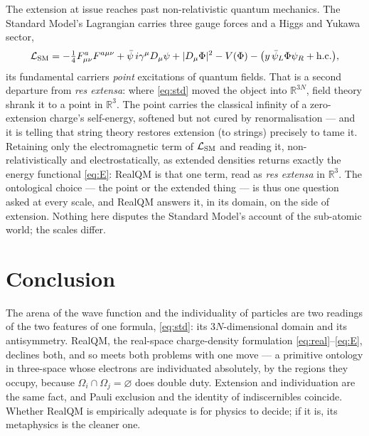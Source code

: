 \documentclass[11pt]{article}
\begin{document}
The extension at issue reaches past non-relativistic quantum mechanics. The Standard Model's Lagrangian
carries three gauge forces and a Higgs and Yukawa sector,
\begin{equation}
\mathcal L_{\rm SM}=-\tfrac14 F^a_{\mu\nu}F^{a\mu\nu}
+\bar\psi\,i\gamma^\mu D_\mu\psi+|D_\mu\Phi|^2-V(\Phi)-\big(y\,\bar\psi_L\Phi\psi_R+\text{h.c.}\big),
\end{equation}
its fundamental carriers \emph{point} excitations of quantum fields. That is a second departure from
\emph{res extensa}: where \eqref{eq:std} moved the object into $\mathbb R^{3N}$, field theory shrank it to
a point in $\mathbb R^3$. The point carries the classical infinity of a zero-extension charge's
self-energy, softened but not cured by renormalisation --- and it is telling that string theory restores
extension (to strings) precisely to tame it. Retaining only the electromagnetic term of $\mathcal L_{\rm
SM}$ and reading it, non-relativistically and electrostatically, as extended densities returns exactly the
energy functional \eqref{eq:E}: RealQM is that one term, read as \emph{res extensa} in $\mathbb R^3$. The
ontological choice --- the point or the extended thing --- is thus one question asked at every scale, and
RealQM answers it, in its domain, on the side of extension. Nothing here
disputes the Standard Model's account of the sub-atomic world; the scales differ.

\section{Conclusion}
\label{sec:concl}

The arena of the wave function and the individuality of particles are two readings of the two features of
one formula, \eqref{eq:std}: its $3N$-dimensional domain and its antisymmetry. RealQM, the real-space
charge-density formulation \eqref{eq:real}--\eqref{eq:E}, declines both, and so meets both problems with one
move --- a primitive ontology in three-space whose electrons are individuated absolutely, by the regions
they occupy, because $\Omega_i\cap\Omega_j=\varnothing$ does double duty. Extension and individuation are
the same fact, and Pauli exclusion and the identity of indiscernibles coincide. Whether RealQM is
empirically adequate is for physics to decide; if it is, its metaphysics is the cleaner one.
\end{document}
